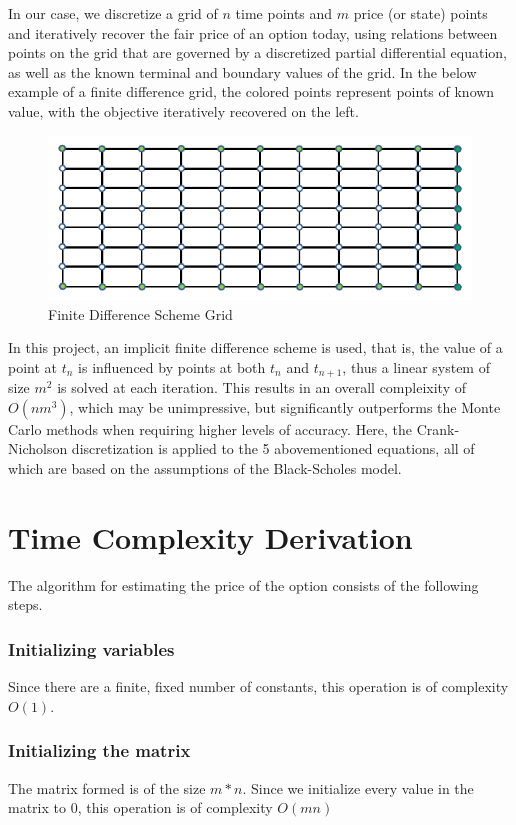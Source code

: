 \documentclass[12pt]{report}
\begin{document}
In our case, we discretize a grid of \(n\) time points and \(m\) price (or state) points and iteratively recover the fair price of an option today, using relations between points on the grid that are governed by a discretized partial differential equation, as well as the known terminal and boundary values of the grid. In the below example of a finite difference grid, the colored points represent points of known value, with the objective iteratively recovered on the left.

\begin{figure}[H]
  \includegraphics[width=\textwidth]{fds.png}
  \caption{Finite Difference Scheme Grid\cite{qf4102}}
  \label{figure:name}
\end{figure}

In this project, an implicit finite difference scheme is used, that is, the value of a point at \(t_n\) is influenced by points at both \(t_n\) and \(t_{n+1}\), thus a linear system of size \(m^2\) is solved at each iteration. This results in an overall compleixity of \(O(nm^3)\), which may be unimpressive, but significantly outperforms the Monte Carlo methods when requiring higher levels of accuracy. Here, the Crank-Nicholson discretization is applied to the 5 abovementioned equations, all of which are based on the assumptions of the Black-Scholes model.

\section{Time Complexity Derivation}
The algorithm for estimating the price of the option consists of the following steps.
\subsubsection{Initializing variables}
Since there are a finite, fixed number of constants, this operation is of complexity \(O(1)\).
\subsubsection{Initializing the matrix}
The matrix formed is of the size \(m*n\). Since we initialize every value in the matrix to 0, this operation is of complexity \(O(mn)\)
\end{document}
